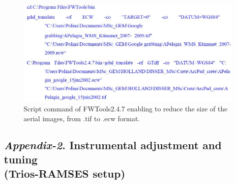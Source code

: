 \documentclass[10pt, a4paper]{article}
\begin{document}
\begin{appendices}
\begin{figure}[H]
	\begin{center}
		\includegraphics[scale=0.4]{Script_Gdal.jpg}
		\caption{Script command of FWTools2.4.7 enabling to reduce the size of the aerial images, from .tif to .ecw format.}
	\end{center}
	\label{fig:A.2}
\end{figure}
\pagebreak

\subsection[\textit{Appendix-2}. Instrumental adjustment and tuning]{\textit{Appendix-2}. Instrumental adjustment and tuning \\ (Trios-RAMSES setup)}


\end{appendices}
\end{document}
